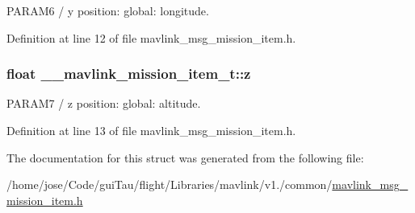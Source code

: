 P\-A\-R\-A\-M6 / y position\-: global\-: longitude. 



Definition at line 12 of file mavlink\-\_\-msg\-\_\-mission\-\_\-item.\-h.

\hypertarget{struct____mavlink__mission__item__t_adfa6844101b755c5e439b46f21ba0be8}{
\subsubsection[{z}]{\setlength{\rightskip}{0pt plus 5cm}float \-\_\-\-\_\-mavlink\-\_\-mission\-\_\-item\-\_\-t\-::z}}\label{struct____mavlink__mission__item__t_adfa6844101b755c5e439b46f21ba0be8}


P\-A\-R\-A\-M7 / z position\-: global\-: altitude. 



Definition at line 13 of file mavlink\-\_\-msg\-\_\-mission\-\_\-item.\-h.



The documentation for this struct was generated from the following file\-:\begin{DoxyCompactItemize}
\item 
/home/jose/\-Code/gui\-Tau/flight/\-Libraries/mavlink/v1./common/\hyperlink{mavlink__msg__mission__item_8h}{mavlink\-\_\-msg\-\_\-mission\-\_\-item.\-h}\end{DoxyCompactItemize}
